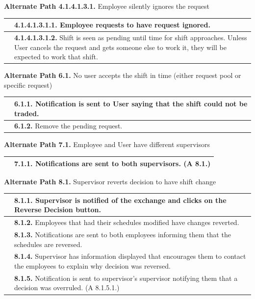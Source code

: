\documentclass[letterpaper,12pt]{report}
\begin{document}
{\centering \textbf{Alternate Path 4.1.4.1.3.1.}
\linebreak Employee silently ignores the request
\begin{center}
\xuchead
\begin{tabular}{| p{8.5cm} | p{8.5cm} |}
\hline
& \textbf{4.1.4.1.3.1.1.} Employee requests to have request ignored. \\
\hline
& \textbf{4.1.4.1.3.1.2.} Shift is seen as pending until time for shift approaches. Unless User cancels the request and gets someone else to work it, they will be expected to work that shift. \\
\hline
\end{tabular}
\end{center}

\pagebreak

\centering \textbf{Alternate Path 6.1.}
\linebreak No user accepts the shift in time (either request pool or specific request) 
\begin{center}
\xuchead
\begin{tabular}{| p{8.5cm} | p{8.5cm} |}
\hline
& \textbf{6.1.1.} Notification is sent to User saying that the shift could not be traded. \\
\hline
& \textbf{6.1.2.} Remove the pending request. \\
\hline
\end{tabular}
\end{center}

\centering \textbf{Alternate Path 7.1.}
\linebreak Employee and User have different supervisors
\begin{center}
\xuchead
\begin{tabular}{| p{8.5cm} | p{8.5cm} |}
\hline
& \textbf{7.1.1.} Notifications are sent to both supervisors. (A 8.1.) \\
\hline
\end{tabular}
\end{center}

\centering \textbf{Alternate Path 8.1.}
\linebreak Supervisor reverts decision to have shift change
\begin{center}
\xuchead
\begin{tabular}{| p{8.5cm} | p{8.5cm} |}
\hline
& \textbf{8.1.1.} Supervisor is notified of the exchange and clicks on the Reverse Decision button. \\
\hline
& \textbf{8.1.2.} Employees that had their schedules modified have changes reverted. \\
\hline
& \textbf{8.1.3.} Notifications are sent to both employees informing them that the schedules are reversed. \\
\hline
& \textbf{8.1.4.} Supervisor has information displayed that encourages them to contact the employees to explain why decision was reversed. \\
\hline
& \textbf{8.1.5.} Notification is sent to supervisor’s supervisor notifying them that a decision was overruled. (A 8.1.5.1.) \\
\hline
\end{tabular}
\end{center}

}
\end{document}
